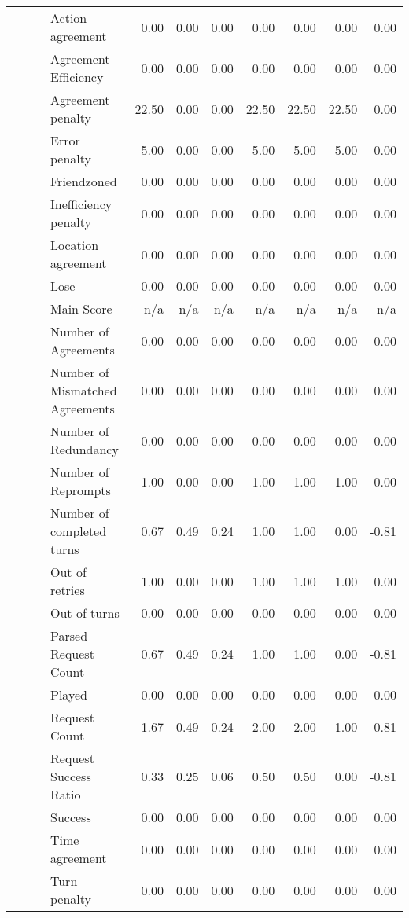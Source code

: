 \begin{tabular}{llllrrrrrrr}
 &  &  & Action agreement & 0.00 & 0.00 & 0.00 & 0.00 & 0.00 & 0.00 & 0.00 \\
 &  &  & Agreement Efficiency & 0.00 & 0.00 & 0.00 & 0.00 & 0.00 & 0.00 & 0.00 \\
 &  &  & Agreement penalty & 22.50 & 0.00 & 0.00 & 22.50 & 22.50 & 22.50 & 0.00 \\
 &  &  & Error penalty & 5.00 & 0.00 & 0.00 & 5.00 & 5.00 & 5.00 & 0.00 \\
 &  &  & Friendzoned & 0.00 & 0.00 & 0.00 & 0.00 & 0.00 & 0.00 & 0.00 \\
 &  &  & Inefficiency penalty & 0.00 & 0.00 & 0.00 & 0.00 & 0.00 & 0.00 & 0.00 \\
 &  &  & Location agreement & 0.00 & 0.00 & 0.00 & 0.00 & 0.00 & 0.00 & 0.00 \\
 &  &  & Lose & 0.00 & 0.00 & 0.00 & 0.00 & 0.00 & 0.00 & 0.00 \\
 &  &  & Main Score & n/a & n/a & n/a & n/a & n/a & n/a & n/a \\
 &  &  & Number of Agreements & 0.00 & 0.00 & 0.00 & 0.00 & 0.00 & 0.00 & 0.00 \\
 &  &  & Number of Mismatched Agreements & 0.00 & 0.00 & 0.00 & 0.00 & 0.00 & 0.00 & 0.00 \\
 &  &  & Number of Redundancy & 0.00 & 0.00 & 0.00 & 0.00 & 0.00 & 0.00 & 0.00 \\
 &  &  & Number of Reprompts & 1.00 & 0.00 & 0.00 & 1.00 & 1.00 & 1.00 & 0.00 \\
 &  &  & Number of completed turns & 0.67 & 0.49 & 0.24 & 1.00 & 1.00 & 0.00 & -0.81 \\
 &  &  & Out of retries & 1.00 & 0.00 & 0.00 & 1.00 & 1.00 & 1.00 & 0.00 \\
 &  &  & Out of turns & 0.00 & 0.00 & 0.00 & 0.00 & 0.00 & 0.00 & 0.00 \\
 &  &  & Parsed Request Count & 0.67 & 0.49 & 0.24 & 1.00 & 1.00 & 0.00 & -0.81 \\
 &  &  & Played & 0.00 & 0.00 & 0.00 & 0.00 & 0.00 & 0.00 & 0.00 \\
 &  &  & Request Count & 1.67 & 0.49 & 0.24 & 2.00 & 2.00 & 1.00 & -0.81 \\
 &  &  & Request Success Ratio & 0.33 & 0.25 & 0.06 & 0.50 & 0.50 & 0.00 & -0.81 \\
 &  &  & Success & 0.00 & 0.00 & 0.00 & 0.00 & 0.00 & 0.00 & 0.00 \\
 &  &  & Time agreement & 0.00 & 0.00 & 0.00 & 0.00 & 0.00 & 0.00 & 0.00 \\
 &  &  & Turn penalty & 0.00 & 0.00 & 0.00 & 0.00 & 0.00 & 0.00 & 0.00 \\

\end{tabular}
